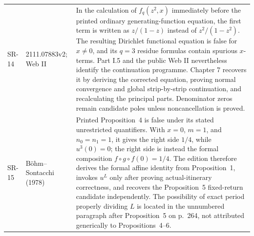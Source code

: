 \begin{longtable}{@{}p{}p{}p{}@{}}
\textsc{SR-14} & 2111.07883v2; Web II & In the calculation of $f_q(z^2,x)$ immediately before the printed ordinary generating-function equation, the first term is written as $z/(1-z)$ instead of $z^2/(1-z^2)$.  The resulting Dirichlet functional equation is false for $x\ne0$, and its $q=3$ residue formulas contain spurious $x$-terms.  Part I.5 and the public Web II nevertheless identify the continuation programme.  Chapter 7 recovers it by deriving the corrected equation, proving normal convergence and global strip-by-strip continuation, and recalculating the principal parts.  Denominator zeros remain candidate poles unless noncancellation is proved.\\

\textsc{SR-15} & B\"ohm--Sontacchi (1978) & Printed Proposition~4 is false
under its stated unrestricted quantifiers.  With $x=0$, $m=1$, and
$n_0=n_1=1$, it gives the right side $1/4$, while $u^3(0)=0$; the right side
is instead the formal composition $f\circ g\circ f(0)=1/4$.  The edition
therefore derives the formal affine identity from Proposition~1, invokes
$u^L$ only after proving actual-itinerary correctness, and recovers the
Proposition~5 fixed-return candidate independently.  The possibility of
exact period properly dividing $L$ is located in the unnumbered paragraph
after Proposition~5 on p.~264, not attributed generically to
Propositions~4--6.\\

\bottomrule
\end{longtable}
\endgroup

